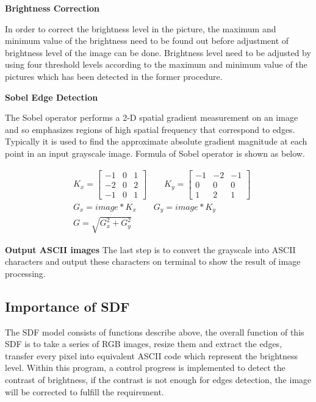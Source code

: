 \documentclass[conference,compsoc]{IEEEtran}
\begin{document}
  
   
    \textbf{Brightness Correction}

    In order to correct the brightness level in the picture, the maximum and minimum value of the brightness need to be found out before adjustment of brightness level of the image can be done. 
    Brightness level need to be adjusted by using four threshold levels according to the maximum and minimum value of the pictures which has been detected in the former procedure.
  
    \textbf{Sobel Edge Detection}

    The Sobel operator performs a 2-D spatial gradient measurement on an image and so emphasizes regions of high spatial frequency that correspond to edges. Typically it is used to find the approximate absolute gradient magnitude at each point in an input grayscale image. Formula of Sobel operator is shown as below.
    
  \begin{align*}%
    &K_x=
    \begin{bmatrix}%
      -1 & 0 & 1 \\
      -2 & 0 & 2 \\
      -1 & 0 & 1
    \end{bmatrix}
    \qquad K_y=
    \begin{bmatrix}
      -1 & -2 & -1 \\
      0 & 0 & 0 \\
      1 & 2 & 1 
    \end{bmatrix}\\
    & G_x = \mathit{image} * K_x \qquad G_y = \mathit{image} * K_y \\
    & G = \sqrt{ G_x^2 + G_y^2 }
  \end{align*}

  \textbf{Output ASCII images}
  The last step is to convert the grayscale into ASCII characters and output these characters on terminal to show the result of image processing. 
\subsection{Importance of SDF}
The SDF model consists of functions describe above, the
overall function of this SDF is to take a series of RGB
images, resize them and extract the edges, transfer every
pixel into equivalent ASCII code which represent the
brightness level. Within this program, a control progress
is implemented to detect the contrast of brightness, if the
contrast is not enough for edges detection, the image will be
corrected to fulfill the requirement.
\end{document}
